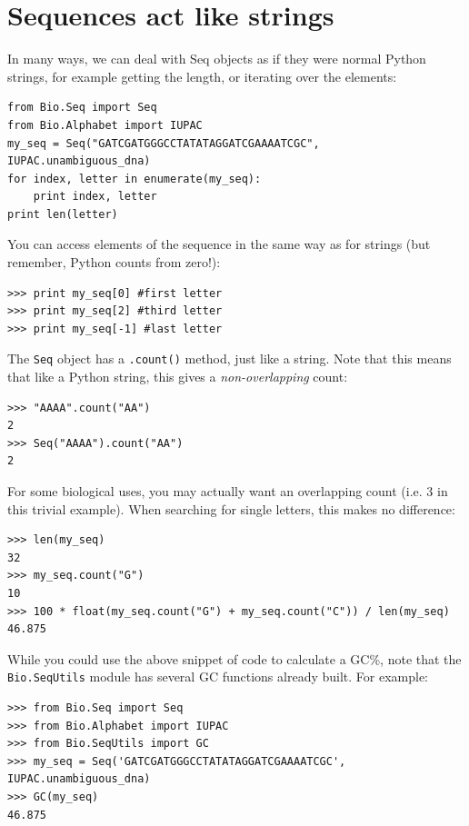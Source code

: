 \documentclass{report}
\begin{document}
\section{Sequences act like strings}

In many ways, we can deal with Seq objects as if they were normal Python strings, for example getting the length, or iterating over the elements:

\begin{verbatim}
from Bio.Seq import Seq
from Bio.Alphabet import IUPAC
my_seq = Seq("GATCGATGGGCCTATATAGGATCGAAAATCGC", IUPAC.unambiguous_dna)
for index, letter in enumerate(my_seq):
    print index, letter
print len(letter)
\end{verbatim}

You can access elements of the sequence in the same way as for strings (but remember, Python counts from zero!):

\begin{verbatim}
>>> print my_seq[0] #first letter
>>> print my_seq[2] #third letter
>>> print my_seq[-1] #last letter
\end{verbatim}

The \verb|Seq| object has a \verb|.count()| method, just like a string.
Note that this means that like a Python string, this gives a
\emph{non-overlapping} count:

\begin{verbatim}
>>> "AAAA".count("AA")
2
>>> Seq("AAAA").count("AA")
2
\end{verbatim}

\noindent For some biological uses, you may actually want an overlapping count
(i.e. $3$ in this trivial example). When searching for single letters, this
makes no difference:

\begin{verbatim}
>>> len(my_seq)
32
>>> my_seq.count("G")
10
>>> 100 * float(my_seq.count("G") + my_seq.count("C")) / len(my_seq)
46.875
\end{verbatim}

While you could use the above snippet of code to calculate a GC\%, note that  the \verb|Bio.SeqUtils| module has several GC functions already built.  For example:

\begin{verbatim}
>>> from Bio.Seq import Seq
>>> from Bio.Alphabet import IUPAC
>>> from Bio.SeqUtils import GC
>>> my_seq = Seq('GATCGATGGGCCTATATAGGATCGAAAATCGC', IUPAC.unambiguous_dna)
>>> GC(my_seq)
46.875
\end{verbatim}
\end{document}
